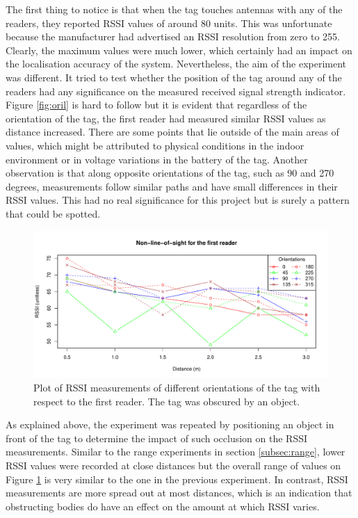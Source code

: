 The first thing to notice is that when the tag touches antennas with any of the readers, they reported RSSI values of around 80 units. This was unfortunate because the manufacturer had advertised an RSSI resolution from zero to 255. Clearly, the maximum values were much lower, which certainly had an impact on the localisation accuracy of the system. Nevertheless, the aim of the experiment was different. It tried to test whether the position of the tag around any of the readers had any significance on the measured received signal strength indicator. Figure \ref{fig:oril} is hard to follow but it is evident that regardless of the orientation of the tag, the first reader had measured similar RSSI values as distance increased. There are some points that lie outside of the main areas of values, which might be attributed to physical conditions in the indoor environment or in voltage variations in the battery of the tag. Another observation is that along opposite orientations of the tag, such as 90 and 270 degrees, measurements follow similar paths and have small differences in their RSSI values. This had no real significance for this project but is surely a pattern that could be spotted. 
\begin{figure}[h]
	\begin{center}
		\includegraphics[width=1\textwidth]{figures/rssi_distance_3m_nlos_r1}
		\caption{Plot of RSSI measurements of different orientations of the tag with respect to the first reader. The tag was obscured by an object.}
		\label{fig:orin}
	\end{center}
\end{figure}

As explained above, the experiment was repeated by positioning an object in front of the tag to determine the impact of such occlusion on the RSSI measurements. Similar to the range experiments in section \ref{subsec:range}, lower RSSI values were recorded at close distances but the overall range of values on Figure \ref{fig:orin} is very similar to the one in the previous experiment. In contrast, RSSI measurements are more spread out at most distances, which is an indication that obstructing bodies do have an effect on the amount at which RSSI varies.


